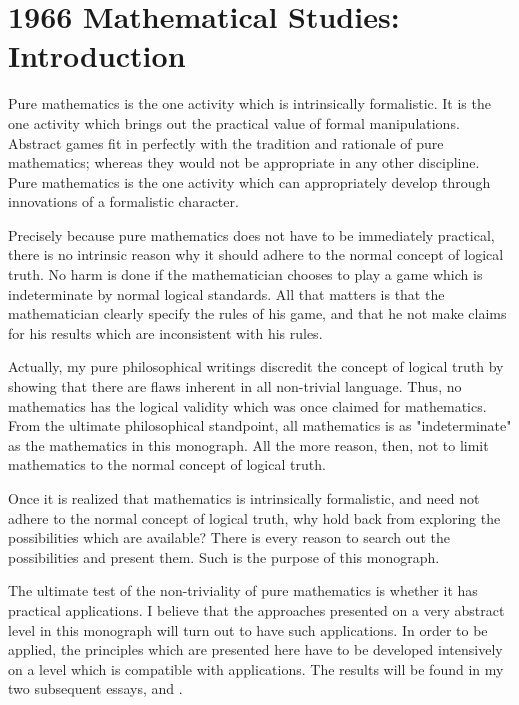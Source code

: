 \chapter{1966 Mathematical Studies: Introduction}

Pure mathematics is the one activity which is intrinsically formalistic. It 
is the one activity which brings out the practical value of formal 
manipulations. Abstract games fit in perfectly with the tradition and 
rationale of pure mathematics; whereas they would not be appropriate in 
any other discipline. Pure mathematics is the one activity which can 
appropriately develop through innovations of a formalistic character. 

Precisely because pure mathematics does not have to be immediately 
practical, there is no intrinsic reason why it should adhere to the normal 
concept of logical truth. No harm is done if the mathematician chooses to 
play a game which is indeterminate by normal logical standards. All that 
matters is that the mathematician clearly specify the rules of his game, and 
that he not make claims for his results which are inconsistent with his rules. 

Actually, my pure philosophical writings discredit the concept of 
logical truth by showing that there are flaws inherent in all non-trivial 
language. Thus, no mathematics has the logical validity which was once 
claimed for mathematics. From the ultimate philosophical standpoint, all 
mathematics is as "indeterminate" as the mathematics in this monograph. 
All the more reason, then, not to limit mathematics to the normal concept 
of logical truth. 

Once it is realized that mathematics is intrinsically formalistic, and need 
not adhere to the normal concept of logical truth, why hold back from 
exploring the possibilities which are available? There is every reason to 
search out the possibilities and present them. Such is the purpose of this 
monograph. 

The ultimate test of the non-triviality of pure mathematics is whether it 
has practical applications. I believe that the approaches presented on a very 
abstract level in this monograph will turn out to have such applications. In 
order to be applied, the principles which are presented here have to be 
developed intensively on a level which is compatible with applications. The 
results will be found in my two subsequent essays,  and .

